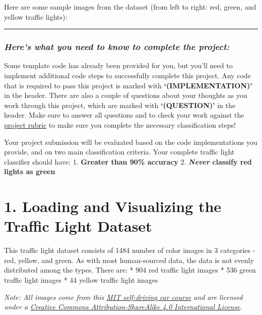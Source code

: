 \documentclass[11pt]{article}
\begin{document}
Here are some sample images from the dataset (from left to right: red,
green, and yellow traffic lights): 

    \begin{center}\rule{0.5\linewidth}{\linethickness}\end{center}

\hypertarget{heres-what-you-need-to-know-to-complete-the-project}{%
\subsubsection{\texorpdfstring{\emph{Here's what you need to know to
complete the
project:}}{Here's what you need to know to complete the project:}}\label{heres-what-you-need-to-know-to-complete-the-project}}

Some template code has already been provided for you, but you'll need to
implement additional code steps to successfully complete this project.
Any code that is required to pass this project is marked with
\textbf{`(IMPLEMENTATION)'} in the header. There are also a couple of
questions about your thoughts as you work through this project, which
are marked with \textbf{`(QUESTION)'} in the header. Make sure to answer
all questions and to check your work against the
\href{https://review.udacity.com/\#!/rubrics/1213/view}{project rubric}
to make sure you complete the necessary classification steps!

Your project submission will be evaluated based on the code
implementations you provide, and on two main classification criteria.
Your complete traffic light classifier should have: 1. \textbf{Greater
than 90\% accuracy} 2. \textbf{\emph{Never} classify red lights as
green}

    \hypertarget{loading-and-visualizing-the-traffic-light-dataset}{%
\section{1. Loading and Visualizing the Traffic Light
Dataset}\label{loading-and-visualizing-the-traffic-light-dataset}}

This traffic light dataset consists of 1484 number of color images in 3
categories - red, yellow, and green. As with most human-sourced data,
the data is not evenly distributed among the types. There are: * 904 red
traffic light images * 536 green traffic light images * 44 yellow
traffic light images

\emph{Note: All images come from this
\href{https://selfdrivingcars.mit.edu/}{MIT self-driving car course} and
are licensed under a
\href{https://creativecommons.org/licenses/by-sa/4.0/}{Creative Commons
Attribution-ShareAlike 4.0 International License}.}
\end{document}
